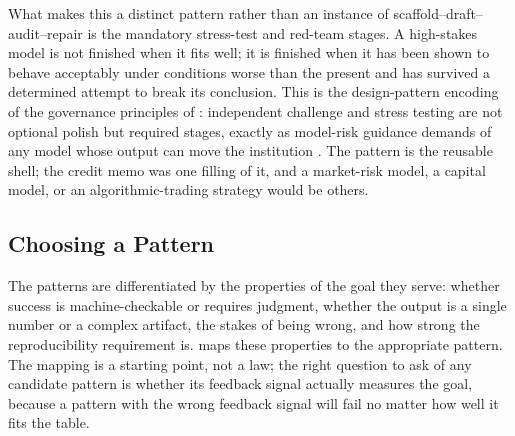 What makes this a distinct pattern rather than an instance of
scaffold--draft--audit--repair is the mandatory stress-test and red-team stages.
A high-stakes model is not finished when it fits well; it is finished when it has
been shown to behave acceptably under conditions worse than the present and has
survived a determined attempt to break its conclusion. This is the design-pattern
encoding of the governance principles of :
independent challenge and stress testing are not optional polish but required
stages, exactly as model-risk guidance demands of any model whose output can move
the institution \citep{sr117}. The pattern is the reusable shell; the credit memo
was one filling of it, and a market-risk model, a capital model, or an
algorithmic-trading strategy would be others.

\subsection{Choosing a Pattern}\label{subsec:choosing-a-pattern}

The patterns are differentiated by the properties of the goal they serve: whether
success is machine-checkable or requires judgment, whether the output is a single
number or a complex artifact, the stakes of being wrong, and how strong the
reproducibility requirement is.  maps these properties
to the appropriate pattern. The mapping is a starting point, not a law; the right
question to ask of any candidate pattern is whether its feedback signal actually
measures the goal, because a pattern with the wrong feedback signal will fail no
matter how well it fits the table.

